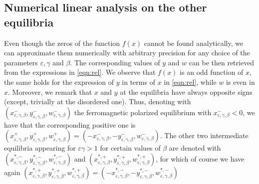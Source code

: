 \documentclass[a4paper,10pt,leqno]{amsart}
\theoremstyle{plain}
\begin{document}
\subsection{Numerical linear analysis on the other equilibria}
Even though the zeros of the function $f(x)$ cannot be found analytically, we can approximate them numerically with arbitrary precision for any choice of the parameters $\varepsilon, \gamma$ and $\beta$. The corresponding values of $y$ and $w$ can be then retrieved from the expressions in \eqref{eqn:rel}. We observe that $f(x)$ is an odd function of $x$, the same holds for the expression of $y$ in terms of $x$ in \eqref{eqn:rel}, while $w$ is even in $x$. Moreover, we remark that $x$ and $y$ at the equilibria have always opposite signs (except, trivially at the disordered one). 
Thus, denoting with $(x^-_{\varepsilon, \gamma, \beta}, y^-_{\varepsilon,\gamma,\beta},w^-_{\varepsilon,\gamma,\beta})$ the ferromagnetic polarized equilibrium with $x^-_{\varepsilon, \gamma, \beta} < 0$, we have that the corresponding positive one is $(x^+_{\varepsilon, \gamma, \beta}, y^+_{\varepsilon,\gamma,\beta},w^+_{\varepsilon,\gamma,\beta}) = (-x^-_{\varepsilon, \gamma, \beta}, -y^-_{\varepsilon,\gamma,\beta},w^-_{\varepsilon,\gamma,\beta})$.
The other two intermediate equilibria appearing for $\varepsilon \gamma > 1$ for certain values of $\beta$ are denoted with $(x^{*,-}_{\varepsilon, \gamma, \beta}, y^{*,-}_{\varepsilon,\gamma,\beta},w^{*,-}_{\varepsilon,\gamma,\beta})$ and $(x^{*,+}_{\varepsilon, \gamma, \beta}, y^{*,+}_{\varepsilon,\gamma,\beta},w^{*,+}_{\varepsilon,\gamma,\beta})$, for which of course we have again $(x^{*,+}_{\varepsilon, \gamma, \beta}, y^{*,+}_{\varepsilon,\gamma,\beta},w^{*,+}_{\varepsilon,\gamma,\beta}) = (-x^{*,-}_{\varepsilon, \gamma, \beta}, -y^{*,-}_{\varepsilon,\gamma,\beta},w^{*,-}_{\varepsilon,\gamma,\beta})$
\end{document}
